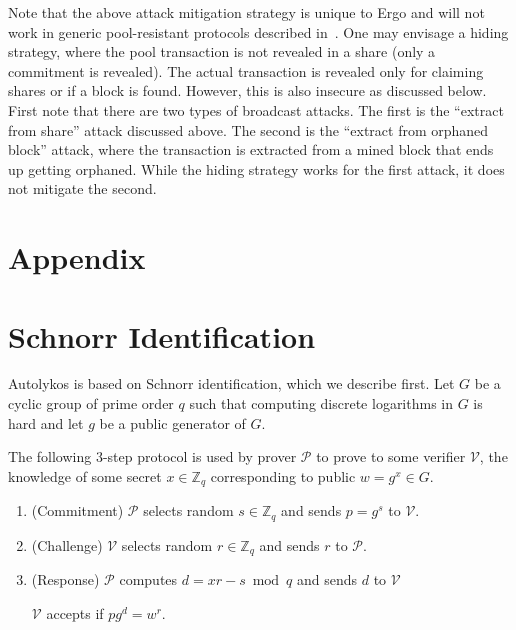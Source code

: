 \documentclass[11pt]{article}
\newcommand{\powname}{Autolykos\xspace}
\begin{document}
Note that the above attack mitigation strategy is unique to Ergo and will not work in generic pool-resistant protocols described in~\cite{miller2015nonoutsourceable}. One may envisage a hiding strategy, where the pool transaction is not revealed in a share (only a commitment is revealed). The actual transaction is revealed only for claiming shares or if a block is found. However, this is also insecure as discussed below. First note that there are two types of broadcast attacks. The first is the ``extract from share'' attack discussed above. The second is the ``extract from orphaned block'' attack, where the transaction is extracted from a mined block that ends up getting orphaned. While the hiding strategy works for the first attack, it does not mitigate the second. 



\appendix
\section*{Appendix}
\section{Schnorr Identification}
\label{schnorr}
\powname is based on Schnorr identification, which we describe first. Let $G$ be a cyclic group of prime order $q$ such that computing discrete logarithms in $G$ is hard and let $g$ be a public generator of $G$. 

The following 3-step protocol is used by prover $\mathcal{P}$ to prove to some verifier $\mathcal{V}$, the knowledge of some secret $x\in\mathbb{Z}_q$ corresponding to public $w = g^x\in G$. 

\begin{enumerate}
	\item (Commitment) $\mathcal{P}$ selects random ${s}\in\mathbb{Z}_q$ and sends ${p} = g^{s}$ to $\mathcal{V}$.
	\item (Challenge) $\mathcal{V}$ selects random $r\in \mathbb{Z}_q$ and sends $r$ to $\mathcal{P}$. 
	\item (Response) $\mathcal{P}$ computes $d = xr-{s} \bmod{q}$ and sends $d$ to $\mathcal{V}$
	
	$\mathcal{V}$ accepts if ${p}g^d = w^r$. 
	
\end{enumerate}
\end{document}
